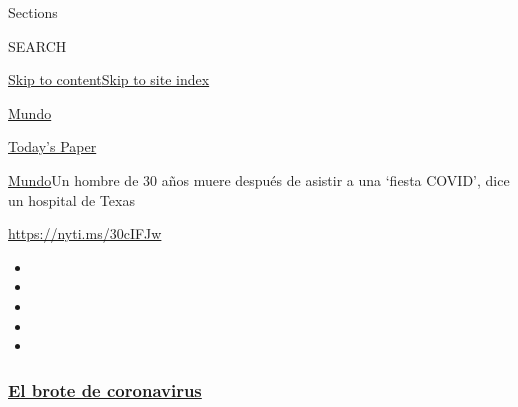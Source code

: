 Sections

SEARCH

\protect\hyperlink{site-content}{Skip to
content}\protect\hyperlink{site-index}{Skip to site index}

\href{https://www.nytimes3xbfgragh.onion/es/section/mundo}{Mundo}

\href{https://myaccount.nytimes3xbfgragh.onion/auth/login?response_type=cookie\&client_id=vi}{}

\href{https://www.nytimes3xbfgragh.onion/section/todayspaper}{Today's
Paper}

\href{/es/section/mundo}{Mundo}\textbar{}Un hombre de 30 años muere
después de asistir a una `fiesta COVID', dice un hospital de Texas

\url{https://nyti.ms/30cIFJw}

\begin{itemize}
\item
\item
\item
\item
\item
\end{itemize}

\hypertarget{el-brote-de-coronavirus}{%
\subsubsection{\texorpdfstring{\href{https://www.nytimes3xbfgragh.onion/es/spotlight/coronavirus?name=styln-coronavirus-es\&region=TOP_BANNER\&block=storyline_menu_recirc\&action=click\&pgtype=Article\&impression_id=64d8ec20-f52e-11ea-ac8a-f5eef0546dac\&variant=undefined}{El
brote de
coronavirus}}{El brote de coronavirus}}\label{el-brote-de-coronavirus}}

